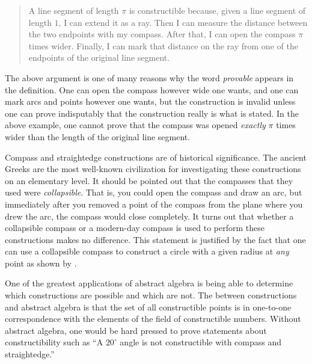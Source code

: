 \documentclass[12pt]{article}
\begin{document}
\begin{quote}
A line segment of length $\pi$ is constructible because, given a line segment of length $1$, I can extend it as a ray.  Then I can measure the distance between the two endpoints with my compass.  After that, I can open the compass $\pi$ times wider.  Finally, I can mark that distance on the ray from one of the endpoints of the original line segment.
\end{quote}

The above argument is one of many reasons why the word \emph{provable} appears in the definition.  One can open the compass however wide one wants, and one can mark arcs and points however one wants, but the construction is invalid unless one can prove indisputably that the construction really is what is stated.  In the above example, one cannot prove that the compass was opened \emph{exactly} $\pi$ times wider than the length of the original line segment.

Compass and straightedge constructions are of historical significance.  The ancient Greeks are the most well-known civilization for investigating these constructions on an elementary level.  It should be pointed out that the compasses that they used were \emph{collapsible}.  That is, you could open the compass and draw an arc, but immediately after you removed a point of the compass from the plane where you drew the arc, the compass would close completely.  It turns out that whether a collapsible compass or a modern-day compass is used to perform these constructions makes no difference.  This statement is justified by the fact that one can use a collapsible compass to construct a circle with a given radius at \emph{any} point as shown by .

One of the greatest applications of abstract algebra is being able to determine which constructions are possible and which are not.  The  between constructions and abstract algebra is that the set of all constructible points is in one-to-one correspondence with the elements of the field of constructible numbers.  Without abstract algebra, one would be hard pressed to prove statements about constructibility such as ``A $20^{\circ}$ angle is not constructible with compass and straightedge.''
\end{document}
